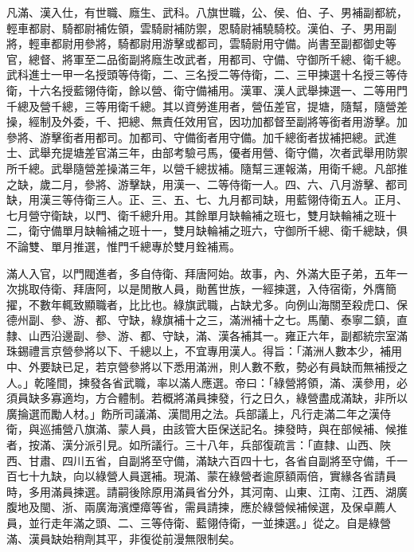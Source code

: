 \begin{pinyinscope}
凡滿、漢入仕，有世職、廕生、武科。八旗世職，公、侯、伯、子、男補副都統，輕車都尉、騎都尉補佐領，雲騎尉補防禦，恩騎尉補驍騎校。漢伯、子、男用副將，輕車都尉用參將，騎都尉用游擊或都司，雲騎尉用守備。尚書至副都御史等官，總督、將軍至二品銜副將廕生改武者，用都司、守備、守御所千總、衛千總。武科進士一甲一名授頭等侍衛，二、三名授二等侍衛，二、三甲揀選十名授三等侍衛，十六名授藍翎侍衛，餘以營、衛守備補用。漢軍、漢人武舉揀選一、二等用門千總及營千總，三等用衛千總。其以資勞進用者，營伍差官，提塘，隨幫，隨營差操，經制及外委，千、把總、無責任效用官，因功加都督至副將等銜者用游擊。加參將、游擊銜者用都司。加都司、守備銜者用守備。加千總銜者拔補把總。武進士、武舉充提塘差官滿三年，由部考驗弓馬，優者用營、衛守備，次者武舉用防禦所千總。武舉隨營差操滿三年，以營千總拔補。隨幫三運報滿，用衛千總。凡部推之缺，歲二月，參將、游擊缺，用漢一、二等侍衛一人。四、六、八月游擊、都司缺，用漢三等侍衛三人。正、三、五、七、九月都司缺，用藍翎侍衛五人。正月、七月營守衛缺，以門、衛千總升用。其餘單月缺輪補之班七，雙月缺輪補之班十二，衛守備單月缺輪補之班十一，雙月缺輪補之班六，守御所千總、衛千總缺，俱不論雙、單月推選，惟門千總專於雙月銓補焉。

滿人入官，以門閥進者，多自侍衛、拜唐阿始。故事，內、外滿大臣子弟，五年一次挑取侍衛、拜唐阿，以是閒散人員，勛舊世族，一經揀選，入侍宿衛，外膺簡擢，不數年輒致顯職者，比比也。綠旗武職，占缺尤多。向例山海關至殺虎口、保德州副、參、游、都、守缺，綠旗補十之三，滿洲補十之七。馬蘭、泰寧二鎮，直隸、山西沿邊副、參、游、都、守缺，滿、漢各補其一。雍正六年，副都統宗室滿珠錫禮言京營參將以下、千總以上，不宜專用漢人。得旨：「滿洲人數本少，補用中、外要缺已足，若京營參將以下悉用滿洲，則人數不敷，勢必有員缺而無補授之人。」乾隆間，揀發各省武職，率以滿人應選。帝曰：「綠營將領，滿、漢參用，必須員缺多寡適均，方合體制。若概將滿員揀發，行之日久，綠營盡成滿缺，非所以廣掄選而勵人材。」飭所司議滿、漢間用之法。兵部議上，凡行走滿二年之漢侍衛，與巡捕營八旗滿、蒙人員，由該管大臣保送記名。揀發時，與在部候補、候推者，按滿、漢分派引見。如所議行。三十八年，兵部復疏言：「直隸、山西、陜西、甘肅、四川五省，自副將至守備，滿缺六百四十七，各省自副將至守備，千一百七十九缺，向以綠營人員選補。現滿、蒙在綠營者逾原額兩倍，實緣各省請員時，多用滿員揀選。請嗣後除原用滿員省分外，其河南、山東、江南、江西、湖廣腹地及閩、浙、兩廣海濱煙瘴等省，需員請揀，應於綠營候補候選，及保卓薦人員，並行走年滿之頭、二、三等侍衛、藍翎侍衛，一並揀選。」從之。自是綠營滿、漢員缺始稍劑其平，非復從前漫無限制矣。


\end{pinyinscope}
